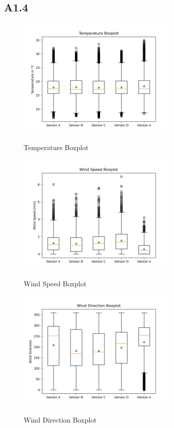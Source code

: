 \documentclass[a4paper,12pt]{article}
\begin{document}
 \subsection{A1.4}
  \begin{figure}[H] 
	\centering
	\includegraphics[width=0.7\textwidth]{Temperature Boxplot.png}
	\caption{Temperature Boxplot}\cite{Maiullari2020}
  \end{figure}
  \begin{figure}[H] 
	\centering
	\includegraphics[width=0.7\textwidth]{Wind Speed Boxplot.png}
	\caption{Wind Speed Boxplot}\cite{Maiullari2020}
  \end{figure}
  \begin{figure}[H] 
	\centering
	\includegraphics[width=0.7\textwidth]{Wind Direction Boxplot.png}
	\caption{Wind Direction Boxplot}\cite{Maiullari2020}
  \end{figure}
\end{document}
